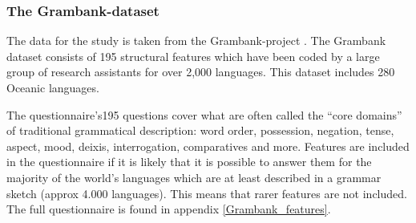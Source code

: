 \documentclass[a4paper,10pt]{article} %
\begin{document}
\subsubsection{The Grambank-dataset}
\label{asr:sec:GBcoverage}

The data for the study is taken from the Grambank-project \citep{grambankwebsite}. The Grambank dataset consists of 195 structural features which have been coded by a large group of research assistants for over 2,000 languages. This dataset includes 280 Oceanic languages. 


 


The questionnaire's195 questions cover what are often called the ``core domains'' of traditional grammatical description: word order, possession, negation, tense, aspect, mood, deixis, interrogation, comparatives and more. Features are included in the questionnaire if it is likely that it is possible to answer them for the majority of the world's languages which are at least described in a grammar sketch (approx 4.000 languages). This means that rarer features are not included. The full questionnaire is found in appendix \ref{Grambank_features}. 
\end{document}
